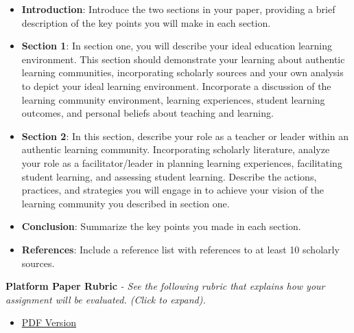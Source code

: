 \documentclass[
]{book}
\providecommand{\tightlist}{%
  \setlength{\itemsep}{0pt}\setlength{\parskip}{0pt}}
\begin{document}
\begin{assessment}
\begin{itemize}
\tightlist
\item
  \textbf{Introduction}: Introduce the two sections in your paper, providing a brief description of the key points you will make in each section.\\
\item
  \textbf{Section 1}: In section one, you will describe your ideal education learning environment. This section should demonstrate your learning about authentic learning communities, incorporating scholarly sources and your own analysis to depict your ideal learning environment. Incorporate a discussion of the learning community environment, learning experiences, student learning outcomes, and personal beliefs about teaching and learning.\\
\item
  \textbf{Section 2}: In this section, describe your role as a teacher or leader within an authentic learning community. Incorporating scholarly literature, analyze your role as a facilitator/leader in planning learning experiences, facilitating student learning, and assessing student learning. Describe the actions, practices, and strategies you will engage in to achieve your vision of the learning community you described in section one.\\
\item
  \textbf{Conclusion}: Summarize the key points you made in each section.\\
\item
  \textbf{References}: Include a reference list with references to at least 10 scholarly sources.
\end{itemize}
\end{assessment}

\textbf{Platform Paper Rubric} \emph{- See the following rubric that explains how your assignment will be evaluated. (Click to expand).}

\begin{itemize}
\tightlist
\item
  \href{assets/assessment/Platform-Paper-RUBRIC.pdf}{PDF Version}
\end{itemize}
\end{document}
